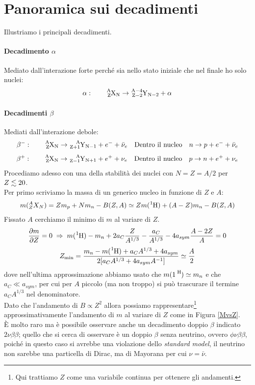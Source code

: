 \newpage

\section{Panoramica sui decadimenti}
Illustriamo i principali decadimenti.

\paragraph{Decadimento $\alpha$} Mediato dall'interazione forte perché sia nello stato iniziale che nel finale ho solo nuclei:
$$\alpha: \qquad \ce{^A_ZX_N} \to \ce{^{A-4}_{Z-2}Y_{N-2}} + \alpha $$
\paragraph{Decadimenti $\beta$} Mediati dall'interazione debole:
$$\beta^-: \qquad \ce{^A_ZX_N} \to \ce{^{A}_{Z+1}Y_{N-1}} + e^- + \bar{\nu}_e \quad \text{Dentro il nucleo}\quad n \to p + e^- + \bar{\nu}_e $$
$$\beta^+: \qquad \ce{^A_ZX_N} \to \ce{^{A}_{Z-1}Y_{N+1}} + e^+ + \nu_e \quad \text{Dentro il nucleo}\quad p \to n + e^+ + \nu_e$$
\noindent Procediamo adesso con una  della stabilità dei nuclei con $N=Z=A/2$ per $Z\lesssim 20$.\\
Per primo scriviamo la massa di un generico nucleo in funzione di $Z$ e $A$:
$$m(\nuc{X}{A}{Z}{N}) = Zm_p + Nm_n - B(Z,A) \simeq Z m(\ce{^1H}) + (A-Z)m_n- B(Z,A)$$
Fissato $A$ cerchiamo il minimo di $m$ al variare di $Z$.
$$\frac{\partial m}{\partial Z} = 0 \;\Rightarrow\; m(\ce{^1H})-m_n + 2a_C \frac{Z}{A^{1/3}} - \frac{a_C}{A^{1/3}}-4a_{sym}\frac{A-2Z}{A} = 0$$
$$Z_{\min} = \frac{m_n - m(\ce{^1H})+a_C A^{1/3}+4 a_{sym}}{2[a_CA^{1/3}+4a_{sym}A^{-1}]}\simeq \frac{A}{2}$$
dove nell'ultima approssimazione abbiamo usato che $m(\ce{1^H})\simeq m_n$ e che $a_C\ll a_{sym}$, per cui per $A$ piccolo (ma non troppo) si può trascurare il termine $a_C A^{1/3}$ nel denominatore.\\
Dato che l'andamento di $B\propto Z^2$ allora possiamo rappresentare\footnote{Qui trattiamo $Z$ come una variabile continua per ottenere gli andamenti.} approssimativamente l'andamento di $m$ al variare di $Z$ come in Figura \ref{MvsZ}.\\
È molto raro ma è possibile osservare anche un decadimento doppio $\beta$ indicato $2\nu\beta\beta$; quello che si cerca di osservare è un doppio $\beta$ senza neutrino, ovvero $\phi \nu \beta\beta$, poiché in questo caso si avrebbe una violazione dello \textit{standard model}, il neutrino non sarebbe una particella di Dirac, ma di Mayorana per cui $\nu = \bar{\nu}$.

